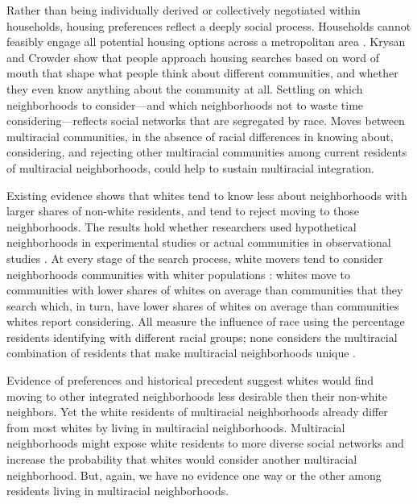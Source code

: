 \documentclass{baderart}
\begin{document}
Rather than being individually derived or collectively negotiated within households, housing preferences reflect a deeply social process. Households cannot feasibly engage all potential housing options across a metropolitan area \citep{brown_intra-urban_1970, maclennan_housing_1982, marsh_uncertainty_2011}. Krysan and Crowder \citeyearpar{krysan_cycle_2017} show that people approach housing searches based on word of mouth that shape what people think about different communities, and whether they even know anything about the community at all. Settling on which neighborhoods to consider---and which neighborhoods not to waste time considering---reflects social networks that are segregated by race.  Moves between multiracial communities, in the absence of racial differences in knowing about, considering, and rejecting other multiracial communities among current residents of multiracial neighborhoods, could help to sustain multiracial integration. 

Existing evidence shows that whites tend to know less about neighborhoods with larger shares of non-white residents, and tend to reject moving to those neighborhoods. The results hold whether researchers used hypothetical neighborhoods in experimental studies or actual communities in observational studies \citep{krysan_perceiving_2007, krysan_does_2009, lewis_who_2011, bader_community_2015}. At every stage of the search process, white movers tend to consider neighborhoods communities with whiter populations \citep{havekes_realizing_2016}: whites move to communities with lower shares of whites on average than communities that they search which, in turn, have lower shares of whites on average than communities whites report considering. All measure the influence of race using the percentage residents identifying with different racial groups; none considers the multiracial combination of residents that make multiracial neighborhoods unique \citep[for exception, see ][]{krysan_diversity_2017}.

Evidence of preferences and historical precedent suggest whites would find moving to other integrated neighborhoods less desirable then their non-white neighbors. Yet the white residents of multiracial neighborhoods already differ from most whites by living in multiracial neighborhoods. Multiracial neighborhoods might expose white residents to more diverse social networks and increase the probability that whites would consider another multiracial neighborhood. But, again, we have no evidence one way or the other among residents living in multiracial neighborhoods.
\end{document}
